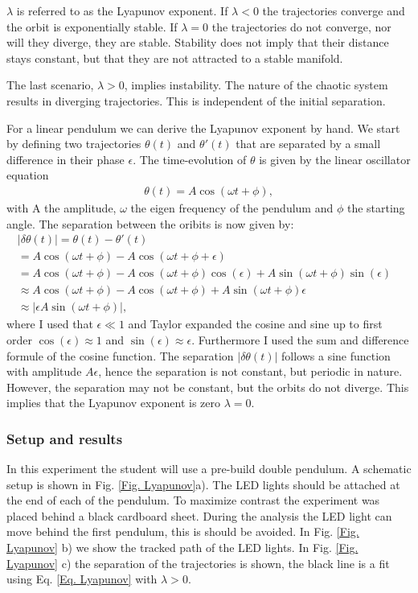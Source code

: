 \documentclass{article}
\begin{document}
$\lambda$ is referred to as the Lyapunov exponent. If $\lambda < 0 $ the trajectories converge and the orbit is exponentially stable. If $\lambda = 0$ the trajectories do not converge, nor will they diverge, they are stable. Stability does not imply that their distance stays constant, but that they are not attracted to a stable manifold.

The last scenario, $\lambda>0$, implies instability. The nature of the chaotic system results in diverging trajectories. This is independent of the initial separation.

For a linear pendulum we can derive the Lyapunov exponent by hand. We start by defining two trajectories $\theta(t)$ and $\theta'(t)$ that are separated by a small difference in their phase $\epsilon$. The time-evolution of $\theta$ is given by the linear oscillator equation
\begin{align}
    \theta(t) =A\cos(\omega t + \phi),
\end{align}
with A the amplitude, $\omega$ the eigen frequency of the pendulum and $\phi$ the starting angle. The separation between the oribits is now given by:
\begin{align}
    |\delta \theta(t)| = \theta(t)-\theta'(t) & \\
    = A\cos(\omega t + \phi) - A\cos(\omega t +\phi +\epsilon) & \\
    = A\cos(\omega t + \phi) - A\cos(\omega t +\phi)\cos(\epsilon) +A\sin(\omega t +\phi)\sin(\epsilon) & \\
    \approx A\cos(\omega t + \phi) - A\cos(\omega t +\phi) +A\sin(\omega t +\phi)\epsilon & \\
    \approx  |\epsilon A \sin(\omega t + \phi)|,
\end{align}
where I used that $\epsilon \ll 1 $ and Taylor expanded the cosine and sine up to first order $\cos(\epsilon)\approx1$ and $\sin(\epsilon)\approx\epsilon$. Furthermore I used the sum and difference formule of the cosine function. The separation $|\delta\theta(t)|$ follows a sine function with amplitude $A\epsilon$, hence the separation is not constant, but periodic in nature. However, the separation may not be constant, but the orbits do not diverge. This implies that the Lyapunov exponent is zero $\lambda =0$. 

\subsubsection{Setup and results}
In this experiment the student will use a pre-build double pendulum. A schematic setup is shown in Fig. \ref{Fig. Lyapunov}a). The LED lights should be attached at the end of each of the pendulum. To maximize contrast the experiment was placed behind a black cardboard sheet. During the analysis the LED light can move behind the first pendulum, this is should be avoided. In Fig. \ref{Fig. Lyapunov} b) we show the tracked path of the LED lights. In Fig. \ref{Fig. Lyapunov} c) the separation of the trajectories is shown, the black line is a fit using Eq. \ref{Eq. Lyapunov} with $\lambda>0$. 
\end{document}
